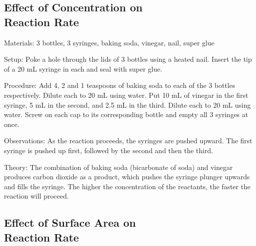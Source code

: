 \begin{multicols}{2}
\subsection{Effect of Concentration on \hfill \\ Reaction Rate}  %


\begin{description*}
\item[Materials:]{3 bottles, 3 syringes, baking soda, vinegar, nail, super glue}
\item[Setup:]{Poke a hole through the lids of 3 bottles using a heated nail. Insert the tip of a 20 mL syringe in each and seal with super glue.}
\item[Procedure:]{Add 4, 2 and 1 teaspoons of baking soda to each of the 3 bottles respectively. Dilute each to 20 mL using water. Put 10 mL of vinegar in the first syringe, 5 mL in the second, and 2.5 mL in the third. Dilute each to 20 mL using water. Screw on each cap to its corresponding bottle and empty all 3 syringes at once.}
\item[Observations:]{As the reaction proceeds, the syringes are pushed upward. The first syringe is pushed up first, followed by the second and then the third.}
\item[Theory:]{The combination of baking soda (bicarbonate of soda) and vinegar produces carbon dioxide as a product, which pushes the syringe plunger upwards and fills the syringe. The higher the concentration of the reactants, the faster the reaction will proceed.}
\end{description*}

\columnbreak

\subsection{Effect of Surface Area on \hfill \\ Reaction Rate} 


\end{multicols}
